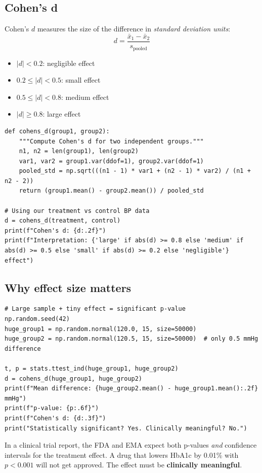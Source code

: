 \subsection{Cohen's d}

Cohen's $d$ measures the size of the difference in \emph{standard deviation units}:
$$d = \frac{\bar{x}_1 - \bar{x}_2}{s_{\text{pooled}}}$$

\begin{itemize}
  \item $|d| < 0.2$: negligible effect
  \item $0.2 \leq |d| < 0.5$: small effect
  \item $0.5 \leq |d| < 0.8$: medium effect
  \item $|d| \geq 0.8$: large effect
\end{itemize}

\begin{verbatim}
def cohens_d(group1, group2):
    """Compute Cohen's d for two independent groups."""
    n1, n2 = len(group1), len(group2)
    var1, var2 = group1.var(ddof=1), group2.var(ddof=1)
    pooled_std = np.sqrt(((n1 - 1) * var1 + (n2 - 1) * var2) / (n1 + n2 - 2))
    return (group1.mean() - group2.mean()) / pooled_std

# Using our treatment vs control BP data
d = cohens_d(treatment, control)
print(f"Cohen's d: {d:.2f}")
print(f"Interpretation: {'large' if abs(d) >= 0.8 else 'medium' if abs(d) >= 0.5 else 'small' if abs(d) >= 0.2 else 'negligible'} effect")
\end{verbatim}

\subsection{Why effect size matters}

\begin{verbatim}
# Large sample + tiny effect = significant p-value
np.random.seed(42)
huge_group1 = np.random.normal(120.0, 15, size=50000)
huge_group2 = np.random.normal(120.5, 15, size=50000)  # only 0.5 mmHg difference

t, p = stats.ttest_ind(huge_group1, huge_group2)
d = cohens_d(huge_group1, huge_group2)
print(f"Mean difference: {huge_group2.mean() - huge_group1.mean():.2f} mmHg")
print(f"p-value: {p:.6f}")
print(f"Cohen's d: {d:.3f}")
print("Statistically significant? Yes. Clinically meaningful? No.")
\end{verbatim}

\begin{clinicalnote}
In a clinical trial report, the FDA and EMA expect both p-values \emph{and} confidence intervals for the treatment effect. A drug that lowers HbA1c by 0.01\% with $p < 0.001$ will not get approved. The effect must be \textbf{clinically meaningful}.
\end{clinicalnote}

